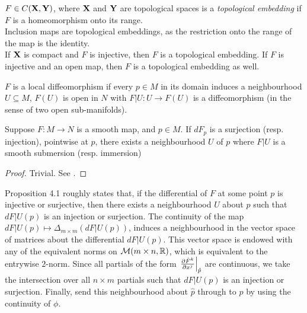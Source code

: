 \documentclass[../main-manifolds.tex]{subfiles}
\begin{document}
\begin{definition}\label{lee-chp4:topological-embedding}
    $F\in C({\mathbf{X}},{\mathbf{Y}})$, where ${\mathbf{X}}$ and ${\mathbf{Y}}$ are topological spaces is a \emph{topological embedding} if $F$ is a homeomorphism onto its range.\\

    Inclusion maps are topological embeddings, as the restriction onto the range of the map is the identity.\\

    If ${\mathbf{X}}$ is compact and $F$ is injective, then $F$ is a topological embedding. If $F$ is injective and an open map, then $F$ is a topological embedding as well.
\end{definition}

\begin{definition}\label{lee-chp4:topological-submersion}
    
\end{definition}

\begin{definition}\label{lee-chp4:local-diffeomorphism-definition}
    $F$ is a local diffeomorphism if every $p\in M$ in its domain induces a neighbourhood $U\subseteq M$, $F(U)$ is open in $N$ with $F|U:U\to F(U)$ is a diffeomorphism (in the sense of two open sub-manifolds).
\end{definition}

\begin{wts}\label{lee-chp4:rank-open-condition-prop-4.1}
    Suppose $F: M\to N$ is a smooth map, and $p\in M$. If $dF_p$ is a surjection (resp. injection), pointwise at $p$, there exists a neighbourhood $U$ of $p$ where $F|U$ is a smooth submersion (resp. immersion)
\end{wts}
\begin{proof}
    Trivial. See .
\end{proof}
Proposition 4.1 roughly states that, if the differential of $F$ at some point $p$ is injective or surjective, then there exists a neighbourhood $U$ about $p$ such that $dF|U(p)$ is an injection or surjection. The continuity of the map $dF|U(p) \mapsto \Delta_{m\times m}(dF|U(p))$, induces a neighbourhood in the vector space of matrices about the differential $dF|U(p)$. This vector space is endowed with any of the equivalent norms on $\mathcal{M}(m\times n,\mathbb{R})$, which is equivalent to the entrywise $2$-norm. Since all partials of the form $\eval{\pdv{\hat{F}^{k}}{x^j}}_{\hat{p}}$ are continuous, we take the intersection over all $n\times m$ partials such that $dF|U(p)$ is an injection or surjection. Finally, send this neighbourhood about $\hat{p}$ through to $p$ by using the continuity of $\phi$.
\end{document}
